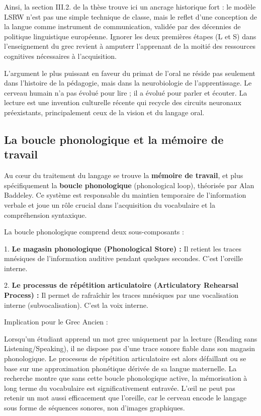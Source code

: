 Ainsi, la section III.2.\cite{III-2-1-ref1} de la thèse trouve ici un ancrage historique fort : le
modèle LSRW n'est pas une simple technique de classe, mais le reflet d'une conception de la langue
comme instrument de communication, validée par des décennies de politique linguistique européenne.
Ignorer les deux premières étapes (L et S) dans l'enseignement du grec revient à amputerr
l'apprenant de la moitié des ressources cognitives nécessaires à l'acquisition.\cite{III-2-1-ref20}

L'argument le plus puissant en faveur du primat de l'oral ne réside pas seulement dans l'histoire de
la pédagogie, mais dans la neurobiologie de l'apprentissage. Le cerveau humain n'a pas évolué pour
lire ; il a évolué pour parler et écouter. La lecture est une invention culturelle récente qui \og
recycle\fg{} des circuits neuronaux préexistants, principalement ceux de la vision et du langage
oral.\cite{III-2-1-ref22}



\subsection{La boucle phonologique et la mémoire de travail}

Au cœur du traitement du langage se trouve la \textbf{mémoire de travail}, et plus spécifiquement la
\textbf{boucle phonologique} (phonological loop), théorisée par Alan Baddeley.\cite{III-2-1-ref24}
Ce système est responsable du maintien temporaire de l'information verbale et joue un rôle crucial
dans l'acquisition du vocabulaire et la compréhension syntaxique.

La boucle phonologique comprend deux sous-composants :

1. \textbf{Le magasin phonologique (Phonological Store) :} Il retient les traces mnésiques de
l'information auditive pendant quelques secondes. C'est \og l'oreille interne\fg{}.

2. \textbf{Le processus de répétition articulatoire (Articulatory Rehearsal Process) :} Il permet de
rafraîchir les traces mnésiques par une \og vocalisation interne\fg{} (subvocalisation). C'est la
\og voix interne\fg{}.\cite{III-2-1-ref24}

Implication pour le Grec Ancien :

Lorsqu'un étudiant apprend un mot grec uniquement par la lecture (Reading sans Listening/Speaking),
il ne dispose pas d'une trace sonore fiable dans son magasin phonologique. Le processus de
répétition articulatoire est alors défaillant ou se base sur une approximation phonétique dérivée de
sa langue maternelle. La recherche montre que sans cette boucle phonologique active, la mémorisation
à long terme du vocabulaire est significativement entravée.\cite{III-2-1-ref25} L'œil ne peut pas
\og retenir\fg{} un mot aussi efficacement que l'oreille, car le cerveau encode le langage sous
forme de séquences sonores, non d'images graphiques.



